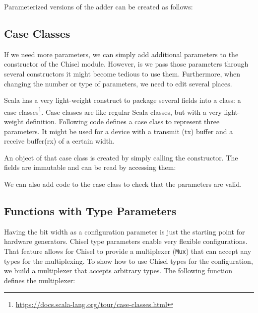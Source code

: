 \documentclass[%
    10pt,
    headinclude, footexclude,
    openright, %
    notitlepage,
    cleardoubleempty,
    headsepline,
    pointlessnumbers,
    bibtotoc, idxtotoc,
    ]{scrbook}
\newcommand{\code}[1]{{\lstinline[basicstyle=\small\ttfamily]{#1}}}
\newcommand{\myref}[2]{\href{#1}{#2}}
\renewcommand{\myref}[2]{{#2}{\footnote{\url{#1}}}}
\begin{document}

\noindent Parameterized versions of the adder can be created as follows:


\subsection{Case Classes}

If we need more parameters, we can simply add additional parameters to the constructor
of the Chisel module. However, is we pass those parameters through several constructors
it might become tedious to use them. Furthermore, when changing the number or type of
parameters, we need to edit several places.

Scala has a very light-weight construct to package several fields into a class:
a \myref{https://docs.scala-lang.org/tour/case-classes.html}{case classes}.
Case classes are like regular Scala classes, but with a very light-weight definition.
Following code defines a case class to represent three parameters. It might be used for
a device with a transmit (tx) buffer and a receive buffer(rx) of a certain width.


\noindent An object of that case class is created by simply calling the constructor.
The fields are immutable and can be read by accessing them:


\noindent We can also add code to the case class to check that the parameters
are valid.


\subsection{Functions with Type Parameters}

Having the bit width as a configuration parameter is just the starting point for
hardware generators. Chisel type parameters enable very flexible configurations.
That feature allows for Chisel to provide a multiplexer (\code{Mux}) that
can accept any types for the multiplexing.
To show how to use Chisel types for the configuration, we build a multiplexer
that accepts arbitrary types. The following function defines the multiplexer:
\end{document}
